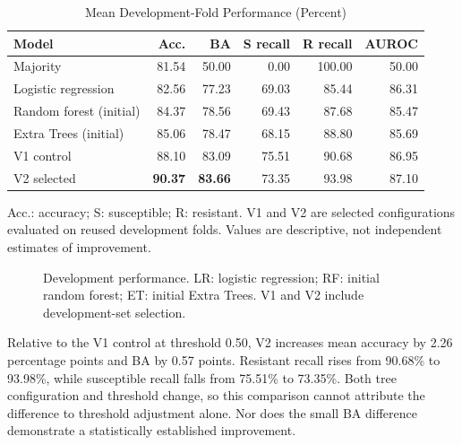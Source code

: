 \documentclass[conference]{IEEEtran}
\begin{document}
\begin{table}[t]
\caption{Mean Development-Fold Performance (Percent)}
\label{tab:models}
\centering\footnotesize
\setlength{\tabcolsep}{3pt}
\begin{tabular}{lrrrrr}\toprule
Model & Acc. & BA & S recall & R recall & AUROC\\\midrule
Majority &81.54&50.00&0.00&100.00&50.00\\
Logistic regression &82.56&77.23&69.03&85.44&86.31\\
Random forest (initial)&84.37&78.56&69.43&87.68&85.47\\
Extra Trees (initial)&85.06&78.47&68.15&88.80&85.69\\
V1 control &88.10&83.09&75.51&90.68&86.95\\
V2 selected &\textbf{90.37}&\textbf{83.66}&73.35&93.98&87.10\\\bottomrule
\end{tabular}
\vspace{3pt}
\parbox{\columnwidth}{\footnotesize Acc.: accuracy; S: susceptible; R: resistant. V1 and V2 are selected configurations evaluated on reused development folds. Values are descriptive, not independent estimates of improvement.}
\end{table}

\begin{figure}[t]
\centering
{}
\caption{Development performance. LR: logistic regression; RF: initial random forest; ET: initial Extra Trees. V1 and V2 include development-set selection.}
\label{fig:bar}
\end{figure}

Relative to the V1 control at threshold 0.50, V2 increases mean accuracy by 2.26 percentage points and BA by 0.57 points. Resistant recall rises from 90.68\% to 93.98\%, while susceptible recall falls from 75.51\% to 73.35\%. Both tree configuration and threshold change, so this comparison cannot attribute the difference to threshold adjustment alone. Nor does the small BA difference demonstrate a statistically established improvement.
\end{document}
